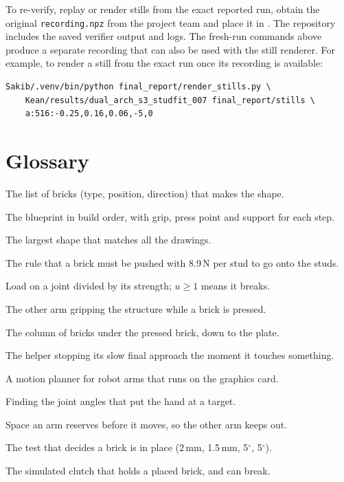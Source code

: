\documentclass[11pt,a4paper]{article}
\begin{document}
To re-verify, replay or render stills from the exact reported run, obtain the
original \texttt{recording.npz} from the project team and place it in
. The repository includes the
saved verifier output and logs. The fresh-run commands above produce a separate
recording that can also be used with the still renderer. For example, to render
a still from the exact run once its recording is available:
\begin{verbatim}
Sakib/.venv/bin/python final_report/render_stills.py \
    Kean/results/dual_arch_s3_studfit_007 final_report/stills \
    a:516:-0.25,0.16,0.06,-5,0
\end{verbatim}

\section{Glossary}
\begin{description}[leftmargin=3cm, style=nextline]
\item[Blueprint] The list of bricks (type, position, direction) that makes the shape.
\item[Plan] The blueprint in build order, with grip, press point and support for each step.
\item[Visual hull] The largest shape that matches all the drawings.
\item[Stud fit] The rule that a brick must be pushed with 8.9\,N per stud to go onto the studs.
\item[Utilisation $u$] Load on a joint divided by its strength; $u\ge1$ means it breaks.
\item[Support / helper] The other arm gripping the structure while a brick is pressed.
\item[Load path] The column of bricks under the pressed brick, down to the plate.
\item[Guard stop] The helper stopping its slow final approach the moment it touches something.
\item[cuRobo] A motion planner for robot arms that runs on the graphics card.
\item[Inverse kinematics] Finding the joint angles that put the hand at a target.
\item[Booking] Space an arm reserves before it moves, so the other arm keeps out.
\item[Snap check] The test that decides a brick is in place (2\,mm, 1.5\,mm, 5$^\circ$, 5$^\circ$).
\item[Weld] The simulated clutch that holds a placed brick, and can break.
\end{description}
\end{document}
